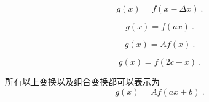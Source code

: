 

\begin{issues}
\issueDraft
\end{issues}

\begin{equation}
g(x) = f(x - \Delta x)~.
\end{equation}

\begin{equation}
g(x) = f(ax)~.
\end{equation}

\begin{equation}
g(x) = A f(x)~.
\end{equation}

\begin{equation}
g(x) = f(2c - x)~.
\end{equation}

所有以上变换以及组合变换都可以表示为
\begin{equation}
g(x) = Af(ax + b)~.
\end{equation}



